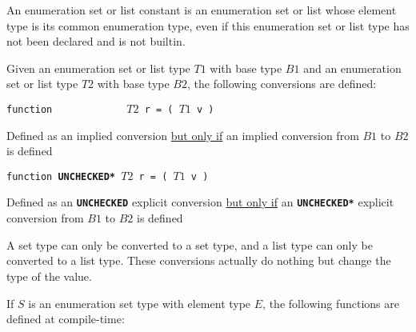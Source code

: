 \documentclass[12pt]{article}
\newcommand{\TT}[1]{{\tt \bfseries #1}}
\newenvironment{indpar}[1][0.3in]%
	{\begin{list}{}%
		     {\setlength{\itemsep}{0in}%
		      \setlength{\topsep}{0in}%
		      \setlength{\parsep}{1ex}%
		      \setlength{\labelwidth}{#1}%
		      \setlength{\leftmargin}{#1}%
		      \addtolength{\leftmargin}{\labelsep}}%
	 \item}%
	{\end{list}}
\begin{document}
An enumeration set or list constant is an enumeration set or list
whose element type 
is its common enumeration type, even if this enumeration set or list
type has not been
declared and is not builtin.

Given an enumeration set or list type $T1$ with base type $B1$ and
an enumeration set or list type $T2$ with base type $B2$, the following
conversions are defined:
\begin{indpar}
{\tt function ~~~~~~~~~~~ $T2$ r = ( $T1$ v )}
\begin{indpar}
    Defined as an implied conversion \underline{but only if}
    an implied conversion from $B1$ to $B2$ is defined
\end{indpar}
{\tt function \TT{*UNCHECKED*} $T2$ r = ( $T1$ v )}
\begin{indpar}
    Defined as an \TT{*UNCHECKED} explicit conversion \underline{but only if}
    an \TT{*UNCHECKED*} explicit conversion from $B1$ to $B2$ is defined
\end{indpar}
\end{indpar}
A set type can only be converted to a set type, and a list type can
only be converted to a list type.
These conversions actually do nothing but change the type of the
value.

If $S$ is an enumeration set type with element type $E$, the following
functions are defined at compile-time:
\end{document}

